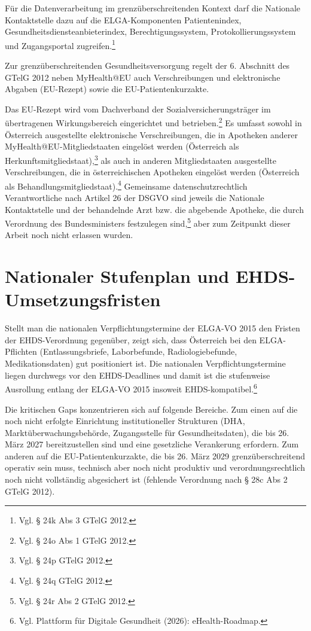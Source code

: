 Für die Datenverarbeitung im grenzüberschreitenden Kontext darf die Nationale Kontaktstelle dazu auf die ELGA-Komponenten Patientenindex, Gesundheitsdiensteanbieterindex, Berechtigungssystem, Protokollierungssystem und Zugangsportal zugreifen.\footnote{Vgl. § 24k Abs 3 GTelG 2012.}

Zur grenzüberschreitenden Gesundheitsversorgung regelt der 6. Abschnitt des GTelG 2012 neben MyHealth@EU auch Verschreibungen und elektronische Abgaben (EU-Rezept) sowie die EU-Patientenkurzakte.

Das EU-Rezept wird vom Dachverband der Sozialversicherungsträger im übertragenen Wirkungsbereich eingerichtet und betrieben.\footnote{Vgl. § 24o Abs 1 GTelG 2012.} Es umfasst sowohl in Österreich ausgestellte elektronische Verschreibungen, die in Apotheken anderer MyHealth@EU-Mitgliedstaaten eingelöst werden (Österreich als Herkunftsmitgliedstaat),\footnote{Vgl. § 24p GTelG 2012.} als auch in anderen Mitgliedstaaten ausgestellte Verschreibungen, die in österreichischen Apotheken eingelöst werden (Österreich als Behandlungsmitgliedstaat).\footnote{Vgl. § 24q GTelG 2012.} Gemeinsame datenschutzrechtlich Verantwortliche nach Artikel 26 der DSGVO sind jeweils die Nationale Kontaktstelle und der behandelnde Arzt bzw. die abgebende Apotheke, die durch Verordnung des Bundesministers festzulegen sind,\footnote{Vgl. § 24r Abs 2 GTelG 2012.} aber zum Zeitpunkt dieser Arbeit noch nicht erlassen wurden.


\section{Nationaler Stufenplan und EHDS-Umsetzungsfristen}
Stellt man die nationalen Verpflichtungstermine der ELGA-VO 2015 den Fristen der EHDS-Verordnung gegenüber, zeigt sich, dass Österreich bei den ELGA-Pflichten (Entlassungsbriefe, Laborbefunde, Radiologiebefunde, Medikationsdaten) gut positioniert ist. Die nationalen Verpflichtungstermine liegen durchwegs vor den EHDS-Deadlines und damit ist die stufenweise Ausrollung entlang der ELGA-VO 2015 insoweit EHDS-kompatibel.\footnote{Vgl. Plattform für
Digitale Gesundheit (2026): eHealth-Roadmap.}

Die kritischen Gaps konzentrieren sich auf folgende Bereiche. Zum einen auf die noch nicht erfolgte Einrichtung institutioneller Strukturen (DHA, Marktüberwachungsbehörde, Zugangsstelle für Gesundheitsdaten), die bis 26. März 2027 bereitzustellen sind und eine gesetzliche Verankerung erfordern. Zum anderen auf die EU-Patientenkurzakte, die bis 26. März 2029 grenzüberschreitend operativ sein muss, technisch aber noch nicht produktiv und verordnungsrechtlich noch nicht vollständig abgesichert ist (fehlende Verordnung nach § 28c Abs 2 GTelG 2012).
